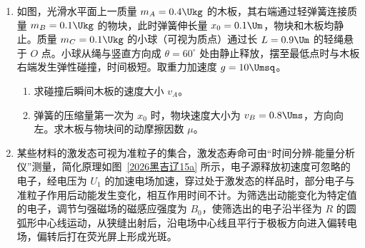 \documentclass[\gkver]{gaokaozhenti}
\begin{document}
\begin{enumerate}
{（2）减速阶段，由动量定理得
\[ -\left(mg-\frac{1}{6}mg\right)t=0-mv_{m} \]
解得 $t=3\Us$。
}
\item
如图，光滑水平面上一质量 $m_{A}=0.4\Ukg$ 的木板，其右端通过轻弹簧连接质量 $m_{B}=0.1\Ukg$ 的物块，此时弹簧伸长量 $x_{0}=0.1\Um$，物块和木板均静止。质量 $m_{C}=0.1\Ukg$ 的小球（可视为质点）通过长 $L=0.9\Um$ 的轻绳悬于 $O$ 点。小球从绳与竖直方向成 $\theta=60^{\circ}$ 处由静止释放，摆至最低点时与木板右端发生弹性碰撞，时间极短。取重力加速度 $g=10\Umsq$。
\begin{enumerate}
	\item
	求碰撞后瞬间木板的速度大小 $v_{A}$。
	\item
	弹簧的压缩量第一次为 $x_{0}$ 时，物块速度大小为 $v_{B}=0.8\Ums$，方向向左。求木板与物块间的动摩擦因数 $\mu$。
\end{enumerate}
\onepicture[align=right, w=7.41cm]{}

\item
某些材料的激发态可视为准粒子的集合，激发态寿命可由“时间分辨-能量分析仪”测量，简化原理如图~\ref{2026黑吉辽15a} 所示，电子源释放初速度可忽略的电子，经电压为 $U_{1}$ 的加速电场加速，穿过处于激发态的样品时，部分电子与准粒子作用后动能发生变化，相互作用时间不计。为筛选出动能变化为特定值的电子，调节匀强磁场的磁感应强度为 $B_{0}$，使筛选出的电子沿半径为 $R$ 的圆弧形中心线运动，从狭缝出射后，沿电场中心线且平行于极板方向进入偏转电场，偏转后打在荧光屏上形成光斑。


\end{enumerate}
\end{document}
